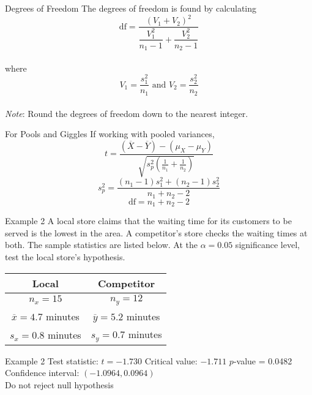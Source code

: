 \documentclass[t]{beamer}
\begin{document}
\begin{frame}{Degrees of Freedom}
The degrees of freedom is found by calculating
\[\text{df} = \dfrac{\left(V_1+V_2\right)^2}{\dfrac{V_1^2}{n_1-1} + \dfrac{V_2^2}{n_2-1}}\]
\newline\\
where
\[V_1 = \frac{s_1^2}{n_1} \text{ and } V_2 = \frac{s_2^2}{n_2}\]
\newline\\
\emph{Note}: Round the degrees of freedom down to the nearest integer.
\end{frame}

\begin{frame}{For Pools and Giggles}
If working with pooled variances,
\[t = \frac{(\overline{X}-\overline{Y}) - (\mu_X - \mu_Y)}{\sqrt{s_p^2\left(\frac{1}{n_1}+\frac{1}{n_2}\right)}}\]
\bigskip
\[s_p^2 = \frac{(n_1-1)s_1^2+(n_2-1)s_2^2}{n_1+n_2-2}\]
\bigskip
\[\text{df} = n_1+n_2-2\]
\end{frame}

\begin{frame}{Example 2}
A local store claims that the waiting time for its customers to be served is the lowest in the area. A competitor's store checks the waiting times at both. The sample statistics are listed below. At the $\alpha = 0.05$ significance level, test the local store's hypothesis.	\newline\\
\begin{center}
\begin{tabular}{c|c}
Local & Competitor \\ \hline
$n_x = 15$ & $n_y = 12$	\\
$\overline{x} = 4.7$ minutes & $\overline{y} = 5.2$ minutes \\
$s_x = 0.8$ minutes & $s_y = 0.7$ minutes
\end{tabular}
\end{center}
\end{frame}

\begin{frame}{Example 2}
Test statistic: $t = -1.730$ \quad Critical value: $-1.711$\newline
$p$-value = 0.0482 \newline
Confidence interval: $(-1.0964, 0.0964)$	\newline\\	\pause
Do not reject null hypothesis	\newline\\	\pause
\begin{quote}

\end{quote}
\end{frame}
\end{document}
